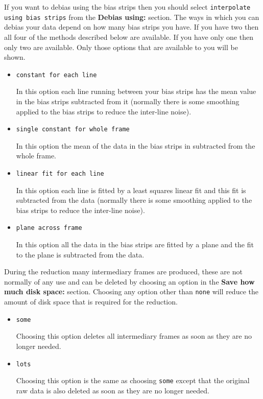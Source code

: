 \documentclass[11pt,nolof]{starlink}
\providecommand{\wlab}[1]{{\bf #1}}
\providecommand{\text}[1]{{\tt #1}}
\begin{document}
If you want to debias using the bias
strips then you should select
\text{interpolate using bias strips} from the \wlab{Debias using:}
section. The ways in which you can debias your data depend on how many
bias strips you have. If you have two then all four of the methods
described below are available. If you have only one then only two are
available. Only those options that are available to you will be shown.

\begin{itemize}
\item \text{constant for each line}

In this option each line running between your bias strips has the mean
value in the bias strips subtracted from it (normally there is some
smoothing applied to the bias strips to reduce the inter-line noise).

\item \text{single constant for whole frame}

In this option the mean of the data in the bias strips in subtracted
from the whole frame.

\item \text{linear fit for each line}

In this option each line is fitted by a least squares linear fit and
this fit is subtracted from the data (normally there is some smoothing
applied to the bias strips to reduce the inter-line noise).

\item \text{plane across frame}

In this option all the data in the bias strips are fitted by a
plane and the fit to the plane is subtracted from the data.
\end{itemize}


During the reduction many intermediary frames are produced, these are
not normally of any use and can be deleted by choosing an option in
the \wlab{Save how much disk space:} section. Choosing any option
other than \text{none} will reduce the amount of disk space that
is required for the reduction.

\begin{itemize}
\item \text{some}

Choosing this option deletes all intermediary frames as soon as they
are no longer needed.

\item \text{lots}

Choosing this option is the same as choosing \text{some} except that
the original raw data is also deleted as soon as they are no longer
needed.

\end{itemize}
\end{document}
